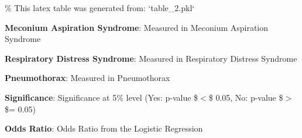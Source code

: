 \documentclass[11pt]{article}
\begin{document}
\begin{codeoutput}
\% This latex table was generated from: `table\_2.pkl`
\begin{table}[h]
\caption{Logistic regression impact of the NRP guideline change on occurrence of Meconium Aspiration Syndrome, Respiratory Distress Syndrome, and Pneumothorax; considers confounders}
\label{table:logistic}
\begin{threeparttable}
\renewcommand{\TPTminimum}{\linewidth}
\begin{tablenotes}
\footnotesize
\item \textbf{Meconium Aspiration Syndrome}: Measured in Meconium Aspiration Syndrome
\item \textbf{Respiratory Distress Syndrome}: Measured in Respiratory Distress Syndrome
\item \textbf{Pneumothorax}: Measured in Pneumothorax
\item \textbf{Significance}: Significance at 5\% level (Yes: p-value \$$<$\$ 0.05, No: p-value \$$>$\$= 0.05)
\item \textbf{Odds Ratio}: Odds Ratio from the Logistic Regression
\end{tablenotes}
\end{threeparttable}
\end{table}
\end{codeoutput}
\end{document}
